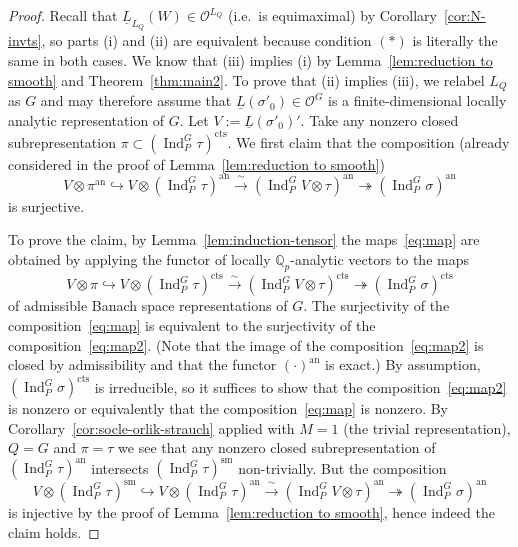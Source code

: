 \documentclass[a4paper]{amsart}
\numberwithin{equation}{section}
\theoremstyle{remark}
\theoremstyle{definition}
\DeclareMathOperator{\Ind}{Ind}
\newcommand{\Q}{\mathbb{Q}}
\newcommand{\sm}{\mathrm{sm}}
\newcommand{\an}{\mathrm{an}}
\newcommand{\cts}{\mathrm{cts}}
\newcommand{\congto}{\xrightarrow{\,\sim\,}}
\newcommand{\into}{\hookrightarrow}
\newcommand{\onto}{\twoheadrightarrow}
\begin{document}
\begin{proof}
  Recall that $\underline{L}_{L_Q}(W) \in \mathcal{O}^{L_Q}$ (i.e.\ is equimaximal) by Corollary~\ref{cor:N-invts}, so parts (i) and (ii) are equivalent because condition $(*)$ is literally the same in both cases.
  We know that (iii) implies (i) by Lemma~\ref{lem:reduction to smooth} and Theorem~\ref{thm:main2}.
  To prove that (ii) implies (iii), we relabel $L_Q$ as $G$ and may therefore assume that 
  $\underline{L}(\sigma'_0) \in \mathcal O^G$ is a finite-dimensional locally analytic representation of $G$.
  Let $V := \underline{L}(\sigma'_0)'$.
  Take any nonzero closed subrepresentation $\pi \subset (\Ind_P^G \tau)^\cts$.
  We first claim that the composition (already considered in the proof of Lemma~\ref{lem:reduction to smooth})
  \begin{equation}\label{eq:map}
    V \otimes \pi^\an \into V \otimes (\Ind_P^G \tau)^\an \congto (\Ind_P^G V \otimes \tau)^\an \onto (\Ind_P^G \sigma)^\an
  \end{equation}
  is surjective.

  To prove the claim, by Lemma~\ref{lem:induction-tensor} the maps~\eqref{eq:map} are obtained by applying the functor of locally $\Q_p$-analytic vectors to the maps
  \begin{equation}\label{eq:map2}
    V \otimes \pi \into V \otimes (\Ind_P^G \tau)^\cts \congto (\Ind_P^G V \otimes \tau)^\cts \onto (\Ind_P^G \sigma)^\cts
  \end{equation}
  of admissible Banach space representations of $G$.
  The surjectivity of the composition~\eqref{eq:map} is equivalent to the surjectivity of the composition~\eqref{eq:map2}. 
  (Note that the image of the composition~\eqref{eq:map2} is closed by admissibility and that the functor $(\cdot)^\an$ is exact.)
  By assumption, $(\Ind_P^G \sigma)^\cts$ is irreducible, so it suffices to show that the composition~\eqref{eq:map2} is nonzero or equivalently that the composition~\eqref{eq:map} is nonzero.
  By Corollary~\ref{cor:socle-orlik-strauch} applied with $M = 1$ (the trivial representation), $Q = G$ and $\pi = \tau$ we see that any nonzero closed subrepresentation of $(\Ind_P^G \tau)^\an$ intersects $(\Ind_P^G \tau)^\sm$ non-trivially.
  But the composition
  \begin{equation*}
    V \otimes (\Ind_P^G \tau)^\sm \into V \otimes (\Ind_P^G \tau)^\an \congto (\Ind_P^G V \otimes \tau)^\an \onto (\Ind_P^G \sigma)^\an
  \end{equation*}
  is injective by the proof of Lemma~\ref{lem:reduction to smooth}, hence indeed the claim holds.
  

\end{proof}
\end{document}
